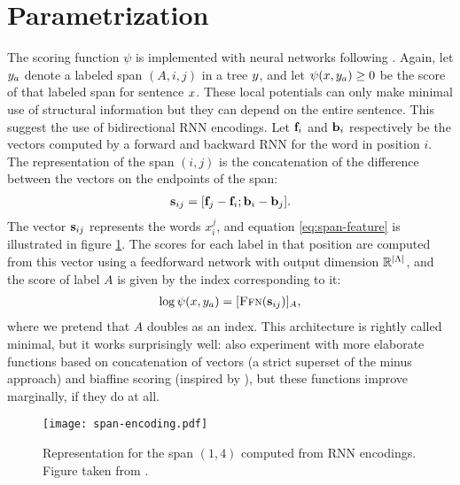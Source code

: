 \section{Parametrization}
  The scoring function $\psi$ is implemented with neural networks following \citet{stern2017minimal}. Again, let $y_a$ denote a labeled span $(A, i, j)$ in a tree $y$, and let $\psi(x, y_a) \geq 0$ be the score of that labeled span for sentence $x$. These local potentials can only make minimal use of structural information but they can depend on the entire sentence. This suggest the use of bidirectional RNN encodings. Let $\mathbf{f}_i$ and $\mathbf{b}_i$ respectively be the vectors computed by a forward and backward RNN for the word in position $i$. The representation of the span $(i, j)$ is the concatenation of the difference between the vectors on the endpoints of the span:
  \begin{align}
    \label{eq:span-feature}
    \mathbf{s}_{ij} = [\mathbf{f}_j - \mathbf{f}_i; \mathbf{b}_i - \mathbf{b}_j].
  \end{align}
  The vector $\mathbf{s}_{ij}$ represents the words $x_i^j$, and equation \ref{eq:span-feature} is illustrated in figure \ref{fig:span-feature}. The scores for each label in that position are computed from this vector using a feedforward network with output dimension $\mathbb{R}^{\lvert \Lambda \rvert}$, and the score of label $A$ is given by the index corresponding to it:
  \begin{align}
    \label{eq:potential-function}
    \log \psi(x, y_a) = [ \textsc{Ffn}( \mathbf{s}_{ij} ) ]_{A},
  \end{align}
  where we pretend that $A$ doubles as an index. This architecture is rightly called minimal, but it works surprisingly well: \citet{stern2017minimal} also experiment with more elaborate functions based on concatenation of vectors (a strict superset of the minus approach) and biaffine scoring (inspired by \citet{dozat2016deep}), but these functions improve marginally, if they do at all.

  \begin{figure}
    \texttt{[image: span-encoding.pdf]}
    \caption{Representation for the span $(1, 4)$ computed from RNN encodings. Figure taken from \citet{stern2018analyis}.}
    \label{fig:span-feature}
  \end{figure}

